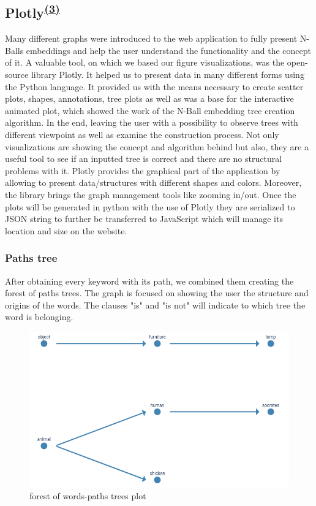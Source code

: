 \subsection[Plotly]{Plotly\textsuperscript{\hyperref[Joanna]{(3)}}} \label{sec::plotly}
Many different graphs were introduced to the web application to fully present N-Balls embeddings and help the user understand the functionality and the concept of it. A valuable tool, on which we based our figure visualizations, was the open-source library Plotly. It helped us to present data in many different forms using the Python language. It provided us with the means necessary to create scatter plots, shapes, annotations, tree plots as well as was a base for the interactive animated plot, which showed the work of the N-Ball embedding tree creation algorithm. In the end, leaving the user with a possibility to observe trees with different viewpoint as well as examine the construction process. Not only visualizations are showing the concept and algorithm behind but also, they are a useful tool to see if an inputted tree is correct and there are no structural problems with it. Plotly provides the graphical part of the application by allowing to present data/structures with different shapes and colors. Moreover, the library brings the graph management tools like zooming in/out. Once the plots will be generated in python with the use of Plotly they are serialized to JSON string to further be transferred to JavaScript which will manage its location and size on the website. 


\subsubsection{Paths tree}
After obtaining every keyword with its path, we combined them creating the forest of paths trees. The graph is focused on showing the user the structure and origins of the words. The clauses "is" and "is not" will indicate to which tree the word is belonging.


\begin{figure}[H]
	\includegraphics[width=\textwidth]{res/tree_forest.png}
	\caption{forest of words-paths trees plot}
	\label{fig:tree_forest}
\end{figure}



